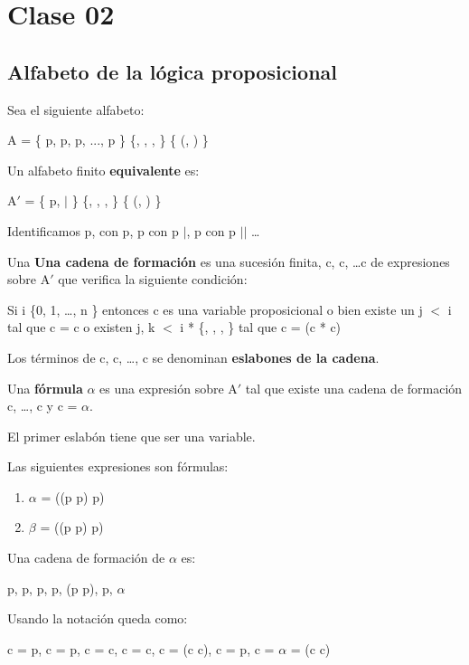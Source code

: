 \section{Clase 02}

\subsection{Alfabeto de la l\'ogica proposicional}

Sea el siguiente alfabeto: 

A = \{ p, p, p, ..., p \} \ccup \{\cneg, \ciff, \clor, \then \} \ccup \{ (, ) \} 

Un alfabeto finito \textbf{equivalente} es:

A$'$ = \{ p, $|$ \} \ccup \{\cneg, \ciff, \clor, \then \} \ccup \{ (, ) \}

Identificamos p, con p, p con p $|$, p con p $||$ \ldots

\begin{definition}
Una \textbf{Una cadena de formaci\'on} es una sucesi\'on finita, c, c, \ldots c de expresiones sobre A$'$ que verifica la siguiente condici\'on:

Si i \cin \{0, 1, \ldots, n \} entonces c es una variable proposicional o bien existe un j $<$ i tal que c = \cneg c  o existen j, k $<$ i * \cin \{\cneg, \cland, \clor, \then \} tal que c = (c * c)

Los t\'erminos de c, c, \ldots, c se denominan \textbf{eslabones de la cadena}.

Una \textbf{f\'ormula} $\alpha$ es una expresi\'on sobre A$'$ tal que existe una cadena de formaci\'on c, \ldots, c y c = $\alpha$.
\end{definition}

\begin{observation}
El primer eslab\'on tiene que ser una variable.
\end{observation}

\begin{example}
Las siguientes expresiones son f\'ormulas:
\begin{enumerate}
	\item $\alpha$ = ((\cneg\cneg p \then p) \then p)
	\item $\beta$ = ((p \clor \cneg p) \then \cneg p)
\end{enumerate}

Una cadena de formaci\'on de $\alpha$ es:

p, p, \cneg p, \cneg\cneg p, (\cneg\cneg p \then p), p, $\alpha$

Usando la notaci\'on queda como:

c = p, c = p, c = \cneg c, c = \cneg c, c = (c \then c), c = p, c = $\alpha$ = (c \then c)

\end{example}

